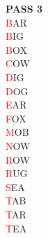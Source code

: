 \documentclass[11pt]{article}
\begin{document}
\begin{center}
\begin{multicols}{3}
\columnbreak
\noindent \textbf{PASS 3}\\
\noindent \textcolor{red}{B}AR\\
\textcolor{red}{B}IG\\
\textcolor{red}{B}OX\\
\textcolor{red}{C}OW\\
\textcolor{red}{D}IG\\
\textcolor{red}{D}OG\\
\textcolor{red}{E}AR\\
\textcolor{red}{F}OX\\
\textcolor{red}{M}OB\\
\textcolor{red}{N}OW\\
\textcolor{red}{R}OW\\
\textcolor{red}{R}UG\\
\textcolor{red}{S}EA\\
\textcolor{red}{T}AB\\
\textcolor{red}{T}AR\\
\textcolor{red}{T}EA\\

\end{multicols}

\end{center}
\vspace{20pt}
\end{document}
